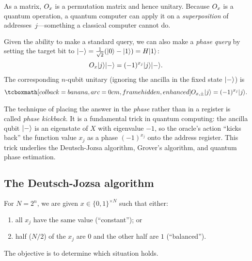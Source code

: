 As a matrix, $O_x$ is a permutation matrix and hence unitary.  Because $O_x$
is a quantum operation, a quantum computer can apply it on a
\emph{superposition} of addresses~$j$---something a classical computer
cannot do.

\begin{definition}\label{def:phase-oracle}
  Given the ability to make a standard query, we can also make a
  \emph{phase query} by setting the target bit to
  $|-\rangle = \frac{1}{\sqrt{2}}(|0\rangle - |1\rangle) = H|1\rangle$:
  \begin{equation}
    O_x |j\rangle|-\rangle = (-1)^{x_j}|j\rangle|-\rangle.
  \end{equation}
  The corresponding $n$-qubit unitary (ignoring the ancilla in the fixed
  state $|-\rangle$) is
  \begin{equation}
    \eqbox{\Oxpm\ket{j} = (-1)^{x_j}\ket{j}.}
  \end{equation}
\end{definition}

\begin{intuition}
  The technique of placing the answer in the \emph{phase} rather than in a
  register is called \emph{phase kickback}.  It is a fundamental trick in
  quantum computing: the ancilla qubit $|-\rangle$ is an eigenstate of
  $X$ with eigenvalue $-1$, so the oracle's action ``kicks back'' the
  function value $x_j$ as a phase $(-1)^{x_j}$ onto the address register.
  This trick underlies the Deutsch-Jozsa algorithm, Grover's algorithm,
  and quantum phase estimation.
\end{intuition}

\subsection{The Deutsch-Jozsa algorithm}\label{subsec:deutsch-jozsa}

\begin{keyresult}
  For $N=2^n$, we are given $x\in \{0,1\}^{\times N}$ such that either:
  \begin{enumerate}
    \item all $x_j$ have the same value (``constant''); or
    \item half ($N/2$) of the $x_j$ are $0$ and the other half are $1$
      (``balanced'').
  \end{enumerate}
  The objective is to determine which situation holds.
\end{keyresult}

